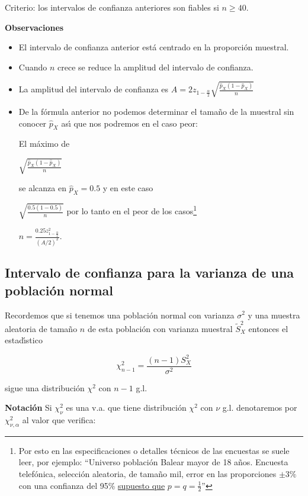 \documentclass[12pt]{report}
\begin{document}
Criterio: los intervalos de confianza anteriores son fiables si $n\geq 40.$

\textbf{Observaciones}

\begin{itemize}
\item El intervalo de confianza anterior est\'a centrado en la
proporci\'on muestral.
\item Cuando $n$ crece se reduce la amplitud del intervalo de confianza.
\item La amplitud del intervalo de confianza es
$A=2 z_{1-\frac{\alpha}{2}} \sqrt{\frac{\hat{p}_{X} (1-\hat{p}_{X})}{n}}$
\item  De la f\'ormula anterior no podemos determinar el tama\~{n}o de la
muestral sin conocer $\hat{p}_{X}$ as\'{\i} que nos podremos en el caso peor:

El m\'aximo  de

$ \sqrt{\frac{\hat{p}_{X} (1-\hat{p}_{X})}{n}}$

 se alcanza en $\hat{p}_{X}=0.5$  y en este caso

 $\sqrt{\frac{0.5(1-0.5)}{n}}$
por lo tanto en el peor de los casos\footnote{ Por esto en las especificaciones o detalles
t\'ecnicos de las encuestas se suele leer, por ejemplo: ``Universo poblaci\'on Balear mayor de
18 a\~{n}os. Encuesta telef\'onica, selecci\'on aleatoria, de tama\~{n}o mil, error en las proporciones
$\pm 3\% $ con una confianza del 95\% \underline{supuesto que} $p=q=\frac{1}{2}$''}

$n=\frac{0.25 z_{1-\frac{\alpha}{2}}^2}{(A/2)^2}$.
\end{itemize}


\subsection{Intervalo de confianza para la varianza de una
poblaci\'on normal}

        Recordemos que si tenemos una poblaci\'on
         normal con varianza $\sigma^2$ y una muestra aleatoria
         de  tama\~{n}o $n$ de esta
         poblaci\'on con varianza muestral $\tilde{S}_{X}^2$ entonces el estad\'{\i}stico

        $$\chi^2_{n-1}=\frac{(n-1) S_{X}^2}{\sigma^2}$$

         sigue una distribuci\'on $\chi^2$ con $n-1$ g.l.

         \textbf{Notaci\'on}
         Si $\chi_{\nu}^2$ es una v.a. que tiene distribuci\'on $\chi^2$ con
         $\nu$ g.l.  denotaremos por $\chi_{\nu,\alpha}^2$  al valor que
         verifica:
\end{document}
